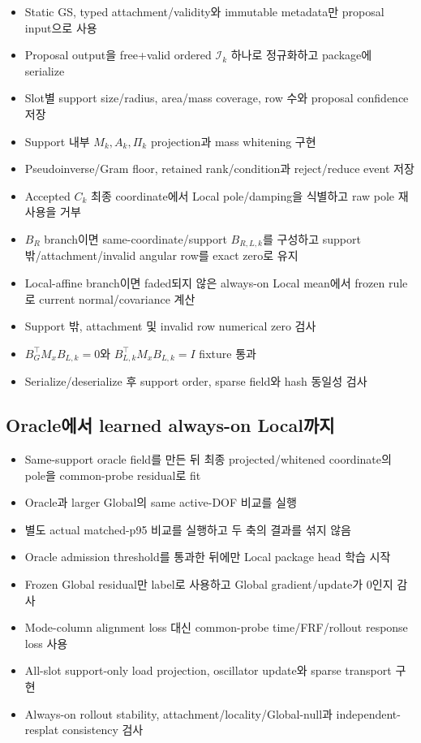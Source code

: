 \documentclass[10pt,a4paper]{article}
\begin{document}
\begin{itemize}
  \item[$\square$] Static GS, typed attachment/validity와 immutable metadata만 proposal input으로 사용
  \item[$\square$] Proposal output을 free+valid ordered \(\mathcal I_k\) 하나로 정규화하고 package에 serialize
  \item[$\square$] Slot별 support size/radius, area/mass coverage, row 수와 proposal confidence 저장
  \item[$\square$] Support 내부 \(M_k,A_k,\Pi_k\) projection과 mass whitening 구현
  \item[$\square$] Pseudoinverse/Gram floor, retained rank/condition과 reject/reduce event 저장
  \item[$\square$] Accepted \(C_k\) 최종 coordinate에서 Local pole/damping을 식별하고 raw pole 재사용을 거부
  \item[$\square$] \(B_R\) branch이면 same-coordinate/support \(B_{R,L,k}\)를 구성하고
  support 밖/attachment/invalid angular row를 exact zero로 유지
  \item[$\square$] Local-affine branch이면 faded되지 않은 always-on Local mean에서 frozen rule로 current normal/covariance 계산
  \item[$\square$] Support 밖, attachment 및 invalid row numerical zero 검사
  \item[$\square$] \(B_G^\top M_xB_{L,k}=0\)와 \(B_{L,k}^\top M_xB_{L,k}=I\) fixture 통과
  \item[$\square$] Serialize/deserialize 후 support order, sparse field와 hash 동일성 검사
\end{itemize}

\subsection{Oracle에서 learned always-on Local까지}

\begin{itemize}
  \item[$\square$] Same-support oracle field를 만든 뒤 최종 projected/whitened coordinate의 pole을 common-probe residual로 fit
  \item[$\square$] Oracle과 larger Global의 same active-DOF 비교를 실행
  \item[$\square$] 별도 actual matched-p95 비교를 실행하고 두 축의 결과를 섞지 않음
  \item[$\square$] Oracle admission threshold를 통과한 뒤에만 Local package head 학습 시작
  \item[$\square$] Frozen Global residual만 label로 사용하고 Global gradient/update가 0인지 감사
  \item[$\square$] Mode-column alignment loss 대신 common-probe time/FRF/rollout response loss 사용
  \item[$\square$] All-slot support-only load projection, oscillator update와 sparse transport 구현
  \item[$\square$] Always-on rollout stability, attachment/locality/Global-null과 independent-resplat consistency 검사
\end{itemize}
\end{document}
